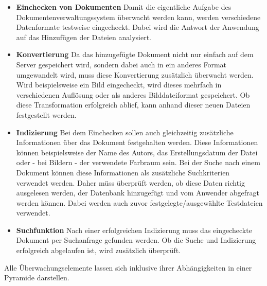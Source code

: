 \begin{itemize}

\item \textbf{Einchecken von Dokumenten} Damit die eigentliche Aufgabe des Dokumentenverwaltungssystem überwacht werden kann, werden verschiedene Datenformate testweise eingecheckt. 
Dabei wird die Antwort der Anwendung auf das Hinzufügen der Dateien analysiert.

\item \textbf{Konvertierung} Da das hinzugefügte Dokument nicht nur einfach auf dem Server gespeichert wird, sondern dabei auch in ein anderes Format umgewandelt wird, muss diese Konvertierung zusätzlich überwacht werden. 
Wird beispielsweise ein Bild eingecheckt, wird dieses mehrfach in verschiedenen Auflösung oder als anderes Bilddateiformat gespeichert. 
Ob diese Transformation erfolgreich ablief, kann anhand dieser neuen Dateien festgestellt werden.

\item \textbf{Indizierung} Bei dem Einchecken sollen auch gleichzeitig zusätzliche Informationen über das Dokument festgehalten werden. 
Diese Informationen können beispielsweise der Name des Autors, das Erstellungsdatum der Datei oder - bei Bildern - der verwendete Farbraum sein. 
Bei der Suche nach einem Dokument können diese Informationen als zusätzliche Suchkriterien verwendet werden.
Daher müss überprüft werden, ob diese Daten richtig ausgelesen werden, der Datenbank hinzugefügt und vom Anwender abgefragt werden können. Dabei werden auch zuvor festgelegte/ausgewählte Testdateien verwendet.

\item \textbf{Suchfunktion} Nach einer erfolgreichen Indizierung muss das eingecheckte Dokument per Suchanfrage gefunden werden.
Ob die Suche und Indizierung erfolgreich abgelaufen ist, wird zusätzlich überprüft. 
\end{itemize}

Alle Überwachungselemente lassen sich inklusive ihrer Abhängigkeiten in einer Pyramide darstellen.

